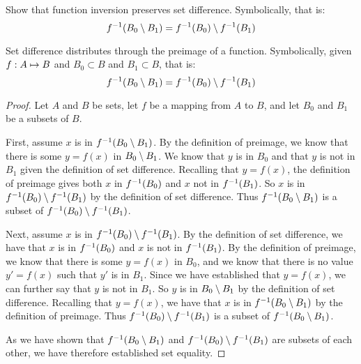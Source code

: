 \documentclass[main.tex]{subfiles}
\begin{document}
\subproblem{}\label{s2p2d}

Show that function inversion preserves set difference. Symbolically, that is:
\[{f}^{-1}(B_0 \setminus B_1) = {f}^{-1}(B_0) \setminus {f}^{-1}(B_1)\]

\begin{thm}
	Set difference distributes through the preimage of a function.
	Symbolically, given \({f}: {A} \mapsto{} {B}\) and \(B_0 \subset B\) and
	\(B_1 \subset B\), that is:
	\[{f}^{-1}(B_0 \setminus B_1) = {f}^{-1}(B_0) \setminus {f}^{-1}(B_1)\]
\end{thm}
\begin{proof}
	Let \(A\) and \(B\) be sets, let \(f\) be a mapping from \(A\) to \(B\),
	and let \(B_0\) and \(B_1\) be a subsets of \(B\).

	First, assume \(x\) is in \({f}^{-1}(B_0 \setminus B_1)\). By the
	definition of preimage, we know that there is some \(y = f(x)\) in
	\(B_0 \setminus B_1\). We know that \(y\) is in \(B_0\) and that \(y\) is
	not in \(B_1\) given the definition of set difference. Recalling that
	\(y = f(x)\), the definition of preimage gives both \(x\) in
	\({f}^{-1}(B_0)\) and \(x\) not in \({f}^{-1}(B_1)\). So \(x\) is
	in \({f}^{-1}(B_0) \setminus {f}^{-1}(B_1)\) by the definition of
	set difference. Thus \({f}^{-1}(B_0 \setminus B_1)\) is a subset of
	\({f}^{-1}(B_0) \setminus {f}^{-1}(B_1)\).

	Next, assume \(x\) is in \({f}^{-1}(B_0) \setminus {f}^{-1}(B_1)\).
	By the definition of set difference, we have that \(x\) is in
	\({f}^{-1}(B_0)\) and \(x\) is not in \({f}^{-1}(B_1)\). By the
	definition of preimage, we know that there is some \(y = f(x)\) in
	\(B_0\), and we know that there is no value \(y' = f(x)\) such that
	\(y'\) is in \(B_1\). Since we have established that \(y = f(x)\), we
	can further say that \(y\) is not in \(B_1\). So \(y\) is in
	\(B_0 \setminus B_1\) by the definition of set difference. Recalling that
	\(y = f(x)\), we have that \(x\) is in \({f}^{-1}(B_0 \setminus B_1)\)
	by the definition of preimage. Thus
	\({f}^{-1}(B_0) \setminus {f}^{-1}(B_1)\) is a subset of
	\({f}^{-1}(B_0 \setminus B_1)\).

	As we have shown that \({f}^{-1}(B_0 \setminus B_1)\) and
	\({f}^{-1}(B_0) \setminus {f}^{-1}(B_1)\) are subsets of each
	other, we have therefore established set equality.
\end{proof}
\end{document}
